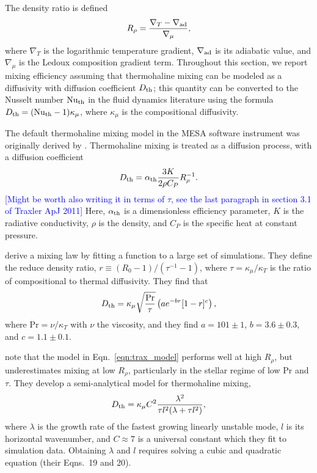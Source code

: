 The density ratio is defined \citep{ulrich_1972}
\begin{equation}
    R_\rho = \frac{\nabla_T - \nabla_{\rm{ad}}}{{\nabla_\mu}},
\end{equation}
where $\nabla_T$ is the logarithmic temperature gradient, $\nabla_{\rm{ad}}$ is its adiabatic value, and $\nabla_\mu$ is the Ledoux composition gradient term.
Throughout this section, we report mixing efficiency assuming that thermohaline mixing can be modeled as a diffusivity with diffusion coefficient $D_{\rm{th}}$; this quantity can be converted to the Nusselt number $\mathrm{Nu}_{\rm{th}}$ in the fluid dynamics literature using the formula $D_{\rm{th}} = (\mathrm{Nu}_{\rm{th}} - 1)\kappa_\mu$, where $\kappa_\mu$ is the compositional diffusivity. 

The default thermohaline mixing model in the MESA software instrument \citep{mesa2} was originally derived by \citet{ulrich_1972, kippenhahn_etal_1980}.
Thermohaline mixing is treated as a diffusion process, with a diffusion coefficient
\begin{equation}
    D_{\rm{th}} = \alpha_{\rm{th}} \frac{3 K}{2\rho C_P}R_{\rho}^{-1}.
    \label{eqn:kipp_model}
\end{equation}
\textcolor{blue}{[Might be worth also writing it in terms of $\tau$, see the last paragraph in section 3.1 of Traxler ApJ 2011]} Here, $\alpha_{\rm{th}}$ is a dimensionless efficiency parameter, $K$ is the radiative conductivity, $\rho$ is the density, and $C_P$ is the specific heat at constant pressure. 

\citet{traxler_etal_2011} derive a mixing law by fitting a function to a large set of simulations.
They define the reduce density ratio, $r \equiv (R_0 - 1)/(\tau^{-1} - 1)$, where $\tau = \kappa_\mu/\kappa_T$ is the ratio of compositional to thermal diffusivity.
They find that
\begin{equation}
   D_{\rm{th}} = \kappa_{\mu}\sqrt{\frac{\mathrm{Pr}}{\tau}}\left(a e^{-br}[1 - r]^c\right),
    \label{eqn:trax_model}
\end{equation}
where $\mathrm{Pr} = \nu / \kappa_T$ with $\nu$ the viscosity, and they find $a = 101 \pm 1$, $b = 3.6 \pm 0.3$, and $c = 1.1 \pm 0.1$.



\citet{brown_etal_2013} note that the model in Eqn.~\ref{eqn:trax_model} performs well at high $R_\rho$, but underestimates mixing at low $R_\rho$, particularly in the stellar regime of low Pr and $\tau$.
They develop a semi-analytical model for thermohaline mixing,
\begin{equation}
    D_{\rm{th}} = \kappa_{\mu}C^2\frac{\lambda^2}{\tau l^2(\lambda + \tau l^2)},
    \label{eqn:brown_model}
\end{equation}
where $\lambda$ is the growth rate of the fastest growing linearly unstable mode, $l$ is its horizontal wavenumber, and $C \approx 7$ is a universal constant which they fit to simulation data.
Obtaining $\lambda$ and $l$ requires solving a cubic and quadratic equation (their Eqns.~19 and 20).

